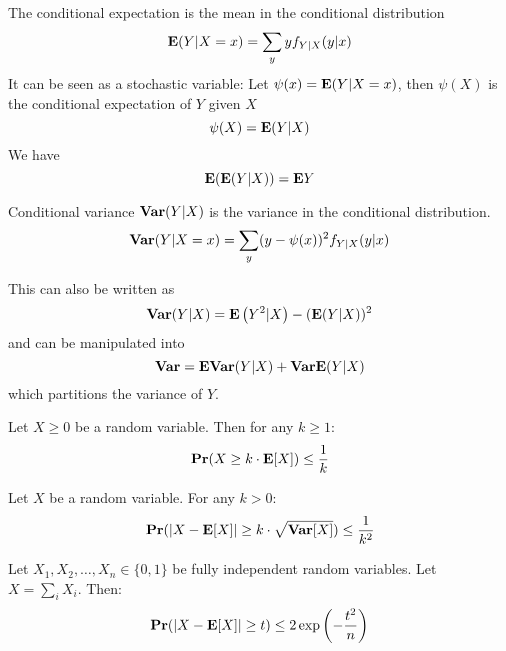 \documentclass[11pt]{article}
\begin{document}
\begin{definition}
The conditional expectation is the mean in the conditional distribution
\begin{equation}
\mathbf{E}(Y | X=x)=\sum_{y} y f_{Y | X}(y | x)
\end{equation}
It can be seen as a stochastic variable: Let $\psi(x)=\mathbf{E}(Y | X=x)$,
then $\psi(X)$ is the conditional expectation of $Y$ given $X$
\begin{equation}
\psi(X)=\mathbf{E}(Y | X)
\end{equation}
We have
\begin{equation}
\mathbf{E}(\mathbf{E}(Y | X))=\mathbf{E} Y
\end{equation}
\end{definition}

\begin{definition}
Conditional variance $\mathbf{Var}(Y|X)$ is the variance in the conditional distribution.
\begin{equation}
\mathbf{Var}(Y | X=x)=\sum_{y}(y-\psi(x))^{2} f_{Y | X}(y | x)
\end{equation}

This can also be written as
$$
\mathbf{Var}(Y | X)=\mathbf{E}\left(Y^{2} | X\right)-(\mathbf{E}(Y | X))^{2}
$$
and can be manipulated into
$$
\mathbf{Var}=\mathbf{E} \mathbf{Var}(Y | X)+\mathbf{Var} \mathbf{E}(Y | X)
$$
which partitions the variance of $Y$.
\end{definition}

\begin{theorem}
Let $X \geq 0$ be a random variable. Then for any $k \geq 1:$
\begin{equation}
\mathbf{Pr}(X \geq k \cdot \mathbf{E}[X]) \leq \frac{1}{k}
\end{equation}
\end{theorem}
\begin{theorem}
Let $X$ be a random variable. For any $k>0$:
\begin{equation}
\mathbf{Pr}(|X-\mathbf{E}[X]| \geq k \cdot \sqrt{\mathbf{Var}[X]}) \leq \frac{1}{k^{2}}
\end{equation}
\end{theorem}
\begin{theorem}
Let $X_{1}, X_{2}, \ldots, X_{n} \in\{0,1\}$ be fully independent random variables. Let $X=\sum_{i} X_{i} .$ Then:
\begin{equation}
    \mathbf{Pr}(|X-\mathbf{E}[X]| \geq t) \leq 2 \exp \left(-\frac{t^{2}}{n}\right)
\end{equation}
\end{theorem}
\end{document}
